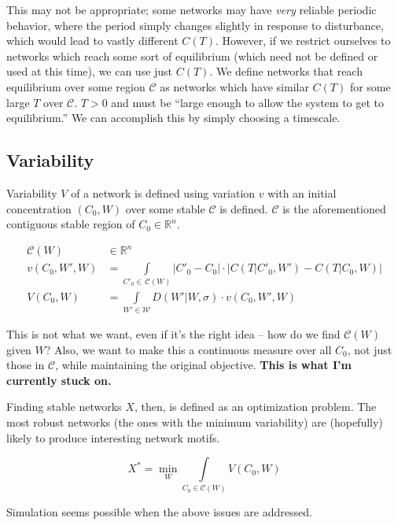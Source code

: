 \documentclass[10pt]{article}
\begin{document}
This may not be appropriate; some networks may have \textit{very} reliable periodic behavior, where the period simply changes slightly in response to disturbance, which would lead to vastly different $C(T)$. However, if we restrict ourselves to networks which reach some sort of equilibrium (which need not be defined or used at this time), we can use just $C(T)$. We define networks that reach equilibrium over some region $\mathcal{C}$ as networks which have similar $C(T)$ for some large $T$ over $\mathcal{C}$. $T > 0$ and must be ``large enough to allow the system to get to equilibrium.'' We can accomplish this by simply choosing a timescale.

\subsection*{Variability}
Variability $V$ of a network is defined using variation $v$ with an initial concentration $(C_0, W)$ over some stable $\mathcal{C}$ is defined. $\mathcal{C}$ is the aforementioned contiguous stable region of $C_0 \in \mathbb{R}^n$.

\begin{align}
  \mathcal{C}(W) &\in \mathbb{R}^n \\
  v(C_0, W', W) &= \int\limits_{C'_0 \in \,\mathcal{C}(W)} \lvert C'_0 - C_0 \rvert \cdot \lvert C(T|C'_0, W') - C(T|C_0, W) \rvert \\
  V(C_0, W) &= \int\limits_{W' \in \mathcal{W}}D(W'|W, \sigma) \cdot v(C_0, W', W)
\end{align}

This is not what we want, even if it's the right idea -- how do we find $\mathcal{C}(W)$ given $W$? Also, we want to make this a continuous measure over all $C_0$, not just those in $\mathcal{C}$, while maintaining the original objective. \textbf{This is what I'm currently stuck on.}

Finding stable networks $X$, then, is defined as an optimization problem. The most robust networks (the ones with the minimum variability) are (hopefully) likely to produce interesting network motifs.

\begin{equation}
  X^* = \min\limits_W \int\limits_{C_0 \in \mathcal{C}(W)}V(C_0, W)
\end{equation}

Simulation seems possible when the above issues are addressed.
\end{document}

